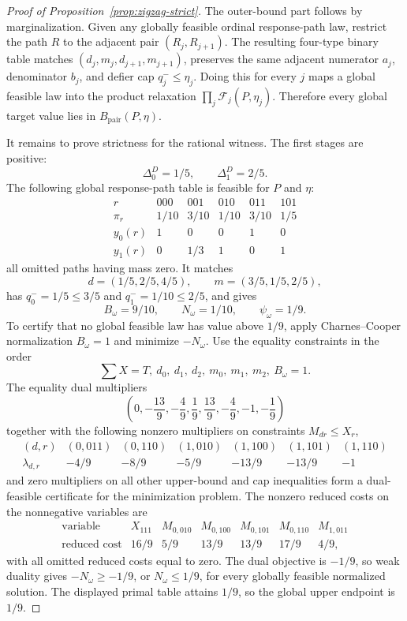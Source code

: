\documentclass[11pt]{article}
\theoremstyle{definition}
\theoremstyle{plain}
\theoremstyle{remark}
\begin{document}
\begin{proof}[Proof of Proposition~\ref{prop:zigzag-strict}]
The outer-bound part follows by marginalization.  Given any globally feasible
ordinal response-path law, restrict the path \(R\) to the adjacent pair
\((R_j,R_{j+1})\).  The resulting four-type binary table matches
\((d_j,m_j,d_{j+1},m_{j+1})\), preserves the same adjacent numerator
\(a_j\), denominator \(b_j\), and defier cap \(q_j^-\le\eta_j\).  Doing this
for every \(j\) maps a global feasible law into the product relaxation
\(\prod_j\mathcal F_j(P,\eta_j)\).  Therefore every global target value lies
in \(B_{\mathrm{pair}}(P,\eta)\).

It remains to prove strictness for the rational witness.  The first stages are
positive:
\[
\Delta^D_0=1/5,\qquad \Delta^D_1=2/5.
\]
The following global response-path table is feasible for \(P\) and \(\eta\):
\[
\begin{array}{c|ccccc}
r & 000 & 001 & 010 & 011 & 101\\ \hline
\pi_r & 1/10 & 3/10 & 1/10 & 3/10 & 1/5\\
y_0(r) & 1 & 0 & 0 & 1 & 0\\
y_1(r) & 0 & 1/3 & 1 & 0 & 1
\end{array}
\]
all omitted paths having mass zero.  It matches
\[
d=(1/5,2/5,4/5),\qquad m=(3/5,1/5,2/5),
\]
has \(q^-_0=1/5\le3/5\) and \(q^-_1=1/10\le2/5\), and gives
\[
B_\omega=9/10,\qquad N_\omega=1/10,\qquad \psi_\omega=1/9.
\]
To certify that no global feasible law has value above \(1/9\), apply
Charnes--Cooper normalization \(B_\omega=1\) and minimize \(-N_\omega\).  Use
the equality constraints in the order
\[
\sum X=T,\ d_0,\ d_1,\ d_2,\ m_0,\ m_1,\ m_2,\ B_\omega=1.
\]
The equality dual multipliers
\[
\left(0,-\frac{13}{9},-\frac49,\frac19,\frac{13}{9},-\frac49,-1,-\frac19\right)
\]
together with the following nonzero multipliers on constraints
\(M_{dr}\le X_r\),
\[
\begin{array}{c|cccccc}
(d,r) &(0,011)&(0,110)&(1,010)&(1,100)&(1,101)&(1,110)\\ \hline
\lambda_{d,r}&-4/9&-8/9&-5/9&-13/9&-13/9&-1
\end{array}
\]
and zero multipliers on all other upper-bound and cap inequalities form a
dual-feasible certificate for the minimization problem.  The nonzero reduced
costs on the nonnegative variables are
\[
\begin{array}{c|cccccc}
\text{variable}&X_{111}&M_{0,010}&M_{0,100}&M_{0,101}&M_{0,110}&M_{1,011}\\
\hline
\text{reduced cost}&16/9&5/9&13/9&13/9&17/9&4/9,
\end{array}
\]
with all omitted reduced costs equal to zero.  The dual objective is
\(-1/9\), so weak duality gives \(-N_\omega\ge-1/9\), or
\(N_\omega\le1/9\), for every globally feasible normalized solution.  The
displayed primal table attains \(1/9\), so the global upper endpoint is
\(1/9\).


\end{proof}
\end{document}
